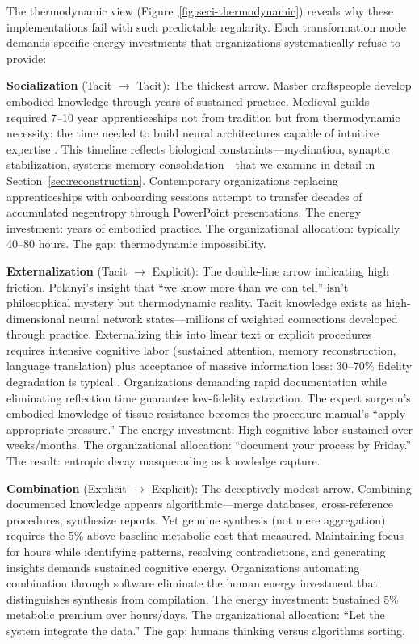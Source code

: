 The thermodynamic view (Figure~\ref{fig:seci-thermodynamic}) reveals why these implementations fail with such predictable regularity. Each transformation mode demands specific energy investments that organizations systematically refuse to provide:

\textbf{Socialization} (Tacit $\rightarrow$ Tacit): The thickest arrow. Master craftspeople develop embodied knowledge through years of sustained practice. Medieval guilds required 7–10 year apprenticeships not from tradition but from thermodynamic necessity: the time needed to build neural architectures capable of intuitive expertise \citep{delacroix2018}. This timeline reflects biological constraints---myelination, synaptic stabilization, systems memory consolidation---that we examine in detail in Section~\ref{sec:reconstruction}. Contemporary organizations replacing apprenticeships with onboarding sessions attempt to transfer decades of accumulated negentropy through PowerPoint presentations. The energy investment: years of embodied practice. The organizational allocation: typically 40–80 hours. The gap: thermodynamic impossibility.

\textbf{Externalization} (Tacit $\rightarrow$ Explicit): The double-line arrow indicating high friction. Polanyi's insight that ``we know more than we can tell'' \citep{polanyi1966} isn't philosophical mystery but thermodynamic reality. Tacit knowledge exists as high-dimensional neural network states---millions of weighted connections developed through practice. Externalizing this into linear text or explicit procedures requires intensive cognitive labor (sustained attention, memory reconstruction, language translation) plus acceptance of massive information loss: 30--70\% fidelity degradation is typical \citep{collins2010}. Organizations demanding rapid documentation while eliminating reflection time guarantee low-fidelity extraction. The expert surgeon's embodied knowledge of tissue resistance becomes the procedure manual's ``apply appropriate pressure.'' The energy investment: High cognitive labor sustained over weeks/months. The organizational allocation: ``document your process by Friday.'' The result: entropic decay masquerading as knowledge capture.

\textbf{Combination} (Explicit $\rightarrow$ Explicit): The deceptively modest arrow. Combining documented knowledge appears algorithmic---merge databases, cross-reference procedures, synthesize reports. Yet genuine synthesis (not mere aggregation) requires the 5\% above-baseline metabolic cost that \citet{jamadar2025} measured. Maintaining focus for hours while identifying patterns, resolving contradictions, and generating insights demands sustained cognitive energy. Organizations automating combination through software eliminate the human energy investment that distinguishes synthesis from compilation. The energy investment: Sustained 5\% metabolic premium over hours/days. The organizational allocation: ``Let the system integrate the data.'' The gap: humans thinking versus algorithms sorting.

